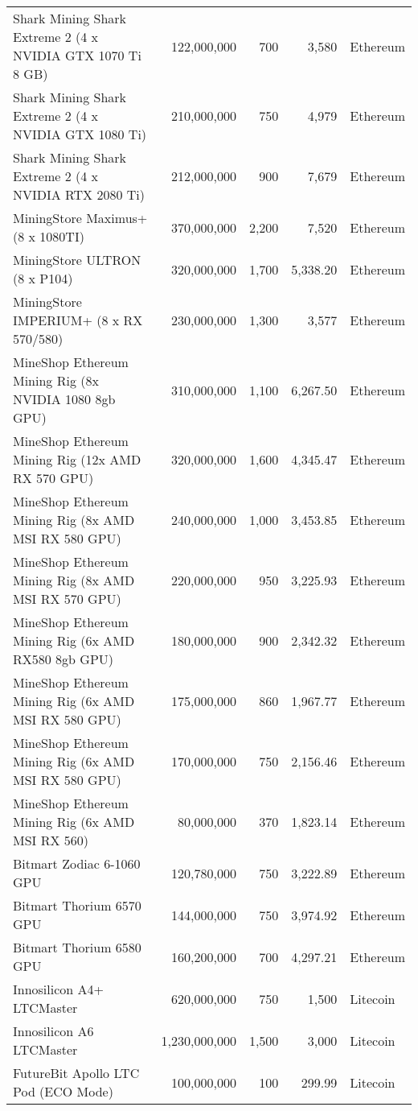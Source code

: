 \begin{longtable}{|p{}|r|r|r|p{}|}
  Shark Mining Shark Extreme 2 (4 x NVIDIA GTX 1070 Ti 8 GB) & 122,000,000 & 700 & 3,580 & Ethereum \\
  Shark Mining Shark Extreme 2 (4 x NVIDIA GTX 1080 Ti) & 210,000,000 & 750 & 4,979 & Ethereum \\
  Shark Mining Shark Extreme 2 (4 x NVIDIA RTX 2080 Ti) & 212,000,000 & 900 & 7,679 & Ethereum \\
  MiningStore Maximus+ (8 x 1080TI) & 370,000,000 & 2,200 & 7,520 & Ethereum \\
  MiningStore ULTRON (8 x P104) & 320,000,000 & 1,700 & 5,338.20 & Ethereum \\
  MiningStore IMPERIUM+ (8 x RX 570/580) & 230,000,000 & 1,300 & 3,577 & Ethereum \\
  MineShop Ethereum Mining Rig (8x NVIDIA 1080 8gb GPU) & 310,000,000 & 1,100 & 6,267.50 & Ethereum \\
  MineShop Ethereum Mining Rig (12x AMD RX 570 GPU) & 320,000,000 & 1,600 & 4,345.47 & Ethereum \\
  MineShop Ethereum Mining Rig (8x AMD MSI RX 580 GPU) & 240,000,000 & 1,000 & 3,453.85 & Ethereum \\
  MineShop Ethereum Mining Rig (8x AMD MSI RX 570 GPU) & 220,000,000 & 950 & 3,225.93 & Ethereum \\
  MineShop Ethereum Mining Rig (6x AMD RX580 8gb GPU) & 180,000,000 & 900 & 2,342.32 & Ethereum \\
  MineShop Ethereum Mining Rig (6x AMD MSI RX 580 GPU) & 175,000,000 & 860 & 1,967.77 & Ethereum \\
  MineShop Ethereum Mining Rig (6x AMD MSI RX 580 GPU) & 170,000,000 & 750 & 2,156.46 & Ethereum \\
  MineShop Ethereum Mining Rig (6x AMD MSI RX 560) & 80,000,000 & 370 & 1,823.14 & Ethereum \\
  Bitmart Zodiac 6-1060 GPU & 120,780,000 & 750 & 3,222.89 & Ethereum \\
  Bitmart Thorium 6570 GPU & 144,000,000 & 750 & 3,974.92 & Ethereum \\
  Bitmart Thorium 6580 GPU & 160,200,000 & 700 & 4,297.21 & Ethereum \\
  \hline
  Innosilicon A4+ LTCMaster & 620,000,000 & 750 & 1,500 & Litecoin \\
  Innosilicon A6 LTCMaster & 1,230,000,000 & 1,500 & 3,000 & Litecoin \\
  FutureBit Apollo LTC Pod (ECO Mode) & 100,000,000 & 100 & 299.99 & Litecoin \\
  \hline

\end{longtable}

